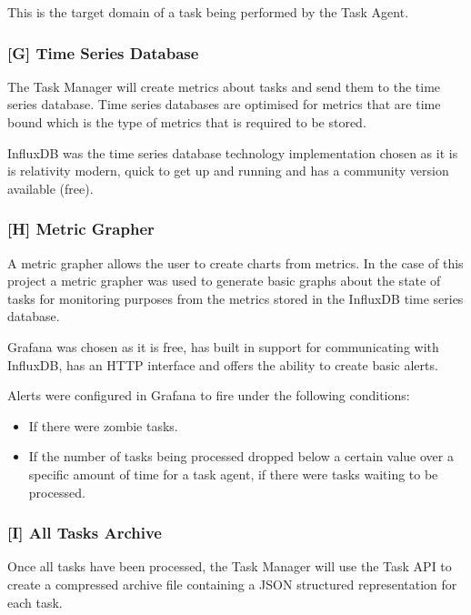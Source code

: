 \documentclass{mscreport}
\begin{document}
This is the target domain of a task being performed by the Task Agent.

\subsubsection{[G] Time Series Database}

The Task Manager will create metrics about tasks and send them to the time series database. Time series databases are optimised for metrics that are time bound which is the type of metrics that is required to be stored. 

\vspace{0.3cm} \noindent
InfluxDB was the time series database technology implementation chosen as it is is relativity modern, quick to get up and running and has a community version available (free).

\subsubsection{[H] Metric Grapher}

A metric grapher allows the user to create charts from metrics. In the case of this project a metric grapher was used to generate basic graphs about the state of tasks for monitoring purposes from the metrics stored in the InfluxDB time series database.

\vspace{0.3cm} \noindent
Grafana was chosen as it is free, has built in support for communicating with InfluxDB, has an HTTP interface and offers the ability to create basic alerts.

\vspace{0.3cm} \noindent
Alerts were configured in Grafana to fire under the following conditions:

\begin{itemize}
	\setlength\itemsep{0.1em}
    \item If there were zombie tasks.
    \item If the number of tasks being processed dropped below a certain value over a specific amount of time for a task agent, if there were tasks waiting to be processed.
\end{itemize}

\subsubsection{[I] All Tasks Archive}

Once all tasks have been processed, the Task Manager will use the Task API to create a compressed archive file containing a JSON structured representation for each task.
\end{document}
